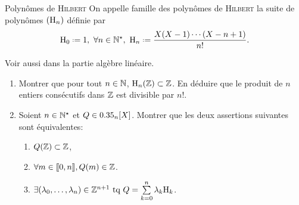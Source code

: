 \begin{defi}{Polynômes de \textsc{Hilbert}}
    On appelle famille des polynômes de \textsc{Hilbert} la suite de polynômes $(\mathrm{H}_n)$ définie par
    $$\Hilb_0 \defeq 1,\ \forall n \in \Ne,\ \Hilb_n \defeq \frac{X(X-1)\cdots(X-n+1)}{n!}.$$
\end{defi}

Voir aussi  dans la partie algèbre linéaire. 

\begin{exercice}
    \begin{enumerate}
        \item Montrer que pour tout $n \in \mathbb{N}$, $\mathrm{H}_n(\mathbb{Z}) \subset \mathbb{Z}$. En déduire que le produit de $n$ entiers consécutifs dans $\mathbb{Z}$ est divisible par $n!$.
        \item Soient $n \in \mathbb{N}^\star$ et $Q \in 0.35_n[X]$. Montrer que les deux assertions suivantes sont équivalentes:
        \begin{enumerate}[label=(\roman*)]
            \item $Q(\mathbb{Z}) \subset \mathbb{Z}$,
            \item $\forall m \in \llbracket 0, n \rrbracket, Q(m) \in \mathbb{Z}$.
            \item $\exists (\lambda_0, \dots, \lambda_n) \in \mathbb{Z}^{n+1} \text{ tq } Q = \sum\limits_{k=0}^n \lambda_k \mathrm{H}_k$.
        \end{enumerate}
    \end{enumerate}
\end{exercice}

\begin{solution}
\end{solution}
